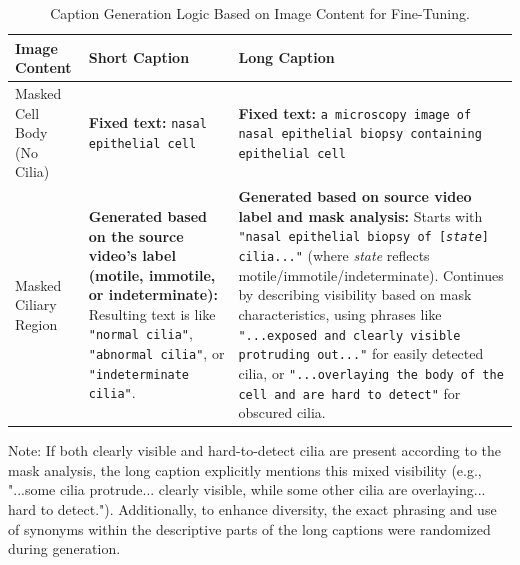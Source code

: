 \documentclass[./dissertation.tex]{subfiles}
\begin{document}
\begin{table}[htbp]
    \centering
    \caption{Caption Generation Logic Based on Image Content for Fine-Tuning.}
    \label{tab:caption_generation_logic}
    \small
    \begin{tabular}{p{3cm}p{5cm}p{7cm}} %
        \toprule %
        \textbf{Image Content}      & \textbf{Short Caption}                                                                                                                                                                                   & \textbf{Long Caption}                                                                                                                                                                                                                                                                                                                                                                                                                                                                \\
        \midrule
        Masked Cell Body (No Cilia) & \textbf{Fixed text:} \texttt{nasal epithelial cell}                                                                                                                                                      & \textbf{Fixed text:} \texttt{a microscopy image of nasal epithelial biopsy containing epithelial cell}                                                                                                                                                                                                                                                                                                                                                                               \\
        \addlinespace %
        Masked Ciliary Region       & \textbf{Generated based on the source video's label (motile, immotile, or indeterminate):} Resulting text is like \texttt{"normal cilia"}, \texttt{"abnormal cilia"}, or \texttt{"indeterminate cilia"}. & \textbf{Generated based on source video label and mask analysis:} Starts with \texttt{"nasal epithelial biopsy of [\textit{state}] cilia..."} (where \textit{state} reflects motile/immotile/indeterminate). Continues by describing visibility based on mask characteristics, using phrases like \texttt{"...exposed and clearly visible protruding out..."} for easily detected cilia, or \texttt{"...overlaying the body of the cell and are hard to detect"} for obscured cilia. \\
        \bottomrule %
    \end{tabular}
    \par\medskip
    \footnotesize
    Note: If both clearly visible and hard-to-detect cilia are present according to the mask analysis, the long caption explicitly mentions this mixed visibility (e.g., "...some cilia protrude... clearly visible, while some other cilia are overlaying... hard to detect."). Additionally, to enhance diversity, the exact phrasing and use of synonyms within the descriptive parts of the long captions were randomized during generation.
\end{table}
\end{document}
